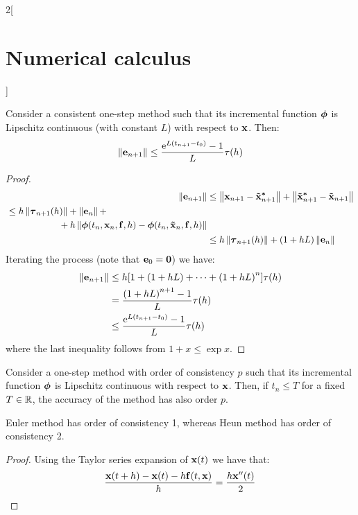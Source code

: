 \documentclass[../../../main_math.tex]{subfiles}
\begin{document}
\begin{multicols}{2}[\section{Numerical calculus}]
\begin{remark}
  \end{remark}
  \begin{theorem}\label{NC:errorLipschitz}
    Consider a consistent one-step method such that its incremental function $\boldsymbol{\mathrm{\phi}}$ is Lipschitz continuous (with constant $L$) with respect to $\boldsymbol{\mathrm{x}}$. Then:
    $$\left\|\boldsymbol{\mathrm{e}}_{n+1}\right\|\leq \frac{\mathrm{e}^{L(t_{n+1}-t_0)}-1}{L}\tau(h)$$
  \end{theorem}
  \begin{proof}
    \begin{align*}
      \left\|\boldsymbol{\mathrm{e}}_{n+1}\right\| & \leq \left\|\boldsymbol{\mathrm{x}}_{n+1}-\boldsymbol{\mathrm{\tilde{x}}}_{n+1}^{\boldsymbol{\mathrm{*}}}\right\|+\left\|\boldsymbol{\mathrm{\tilde{x}}}_{n+1}^{\boldsymbol{\mathrm{*}}}-\boldsymbol{\mathrm{\tilde{x}}}_{n+1}\right\|                  \\
      \begin{split}
        & \leq h\left\|\boldsymbol{\mathrm{\tau}}_{n+1}(h)\right\|+\left\|\boldsymbol{\mathrm{e}}_n\right\|+\\&\hspace{2cm}+h\left\|\boldsymbol{\mathrm{\phi}}(t_n,\boldsymbol{\mathrm{x}}_{n},\boldsymbol{\mathrm{f}},h)-\boldsymbol{\mathrm{\phi}}(t_n,\boldsymbol{\mathrm{\tilde{x}}}_{n},\boldsymbol{\mathrm{{f}}},h)\right\|
      \end{split} \\
                          & \leq h\left\|\boldsymbol{\mathrm{\tau}}_{n+1}(h)\right\|+(1+hL)\left\|\boldsymbol{\mathrm{e}}_n\right\|
    \end{align*}
    Iterating the process (note that $\boldsymbol{\mathrm{e}}_0=\boldsymbol{\mathrm{0}}$) we have:
    \begin{align*}
      \left\|\boldsymbol{\mathrm{e}}_{n+1}\right\| & \leq h[1+(1+hL)+\cdots+{(1+hL)}^n]\tau(h)    \\
                          & = \frac{{(1+hL)}^{n+1}-1}{L}\tau(h)          \\
                          & \leq \frac{\mathrm{e}^{L(t_{n+1}-t_0)}-1}{L}\tau(h)
    \end{align*}
    where the last inequality follows from $1+x\leq\exp{x}$.
  \end{proof}
  \begin{corollary}
    Consider a one-step method with order of consistency $p$ such that its incremental function $\boldsymbol{\mathrm{\phi}}$ is Lipschitz continuous with respect to $\boldsymbol{\mathrm{x}}$. Then, if $t_n\leq T$ for a fixed $T\in\mathbb{R}$, the accuracy of the method has also order $p$.
  \end{corollary}
  \begin{lemma}
    Euler method has order of consistency 1, whereas Heun method has order of consistency 2.
  \end{lemma}
  \begin{proof}
    Using the Taylor series expansion of $\boldsymbol{\mathrm{x}}(t)$ we have that:
    $$\frac{\boldsymbol{\mathrm{x}}(t+h)-\boldsymbol{\mathrm{x}}(t)-h\boldsymbol{\mathrm{f}}(t,\boldsymbol{\mathrm{x}})}{h}=\frac{h\boldsymbol{\mathrm{x}}''(t)}{2}$$

\end{proof}
\end{multicols}
\end{document}
